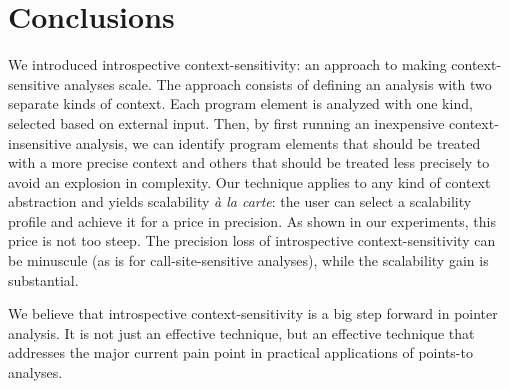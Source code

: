 \section{Conclusions}

We introduced introspective context-sensitivity: an approach to making
context-sensitive analyses scale. The approach consists of defining an
analysis with two separate kinds of context. Each program element is
analyzed with one kind, selected based on external input. Then, by
first running an inexpensive context-insensitive analysis, we can
identify program elements that should be treated with a more precise
context and others that should be treated less precisely to avoid an
explosion in complexity. Our technique applies to any kind of context
abstraction and yields scalability \emph{\`{a} la carte}: the user can
select a scalability profile and achieve it for a price in
precision. As shown in our experiments, this price is not too
steep. The precision loss of introspective context-sensitivity can be
minuscule (as is for call-site-sensitive analyses), while the
scalability gain is substantial. 

We believe that introspective context-sensitivity is a big step
forward in pointer analysis. It is not just an effective technique,
but an effective technique that addresses the major current pain point
in practical applications of points-to analyses.
